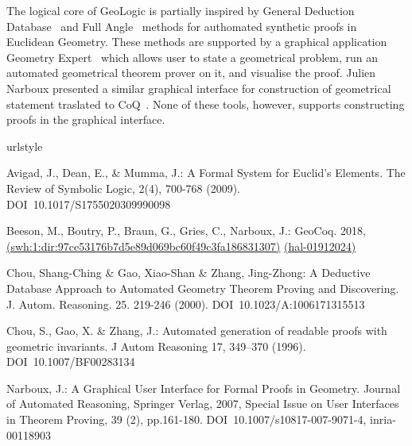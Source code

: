 \documentclass[runningheads]{llncs}
\begin{document}
The logical core of GeoLogic is partially inspired by General
Deduction Database~\cite{GDD} and Full Angle~\cite{FullAngle} methods for authomated synthetic proofs in
Euclidean Geometry.
These methods are supported by a graphical application
Geometry Expert~\cite{GEX} which allows user to state a
geometrical problem, run an automated geometrical theorem prover on
it, and visualise the proof.
Julien Narboux presented a similar graphical interface for
construction of geometrical statement traslated to
CoQ~\cite{GeoProof}.
None of these tools, however, supports constructing proofs in the
graphical interface.

\begin{thebibliography}
\expandafter\ifx\csname urlstyle\endcsname\relax
  \providecommand{\doi}[1]{DOI~\discretionary{}{}{}#1}\else
  \providecommand{\doi}{DOI~\discretionary{}{}{}\begingroup
  \urlstyle{rm}\Url}\fi

  Avigad, J., Dean, E., \& Mumma, J.: A Formal System for Euclid's Elements.
  \newblock The Review of Symbolic Logic, 2(4), 700-768 (2009).
  \newblock \doi{10.1017/S1755020309990098}

  Beeson, M., Boutry, P., Braun, G., Gries, C., Narboux, J.: GeoCoq. 2018,
  \newblock \href{https://archive.softwareheritage.org/browse/swh:1:dir:97ce53176b7d5e89d069bc60f49c3fa186831307}{(swh:1:dir:97ce53176b7d5e89d069bc60f49c3fa186831307)}
  \newblock \href{https://hal.inria.fr/hal-01912024}{(hal-01912024)}

  Chou, Shang-Ching \& Gao, Xiao-Shan \& Zhang, Jing-Zhong:
  A Deductive Database Approach to Automated Geometry Theorem Proving
  and Discovering.
  \newblock J. Autom. Reasoning. 25. 219-246 (2000).
  \newblock \doi{10.1023/A:1006171315513}

  Chou, S., Gao, X. \& Zhang, J.: Automated generation of readable proofs
  with geometric invariants.
  \newblock J Autom Reasoning 17, 349–370 (1996).
  \newblock \doi{10.1007/BF00283134}

  Narboux, J.: A Graphical User Interface for Formal Proofs in
  Geometry.
  \newblock Journal of Automated Reasoning, Springer Verlag, 2007,
  \newblock Special Issue on User Interfaces in Theorem Proving, 39
  (2), pp.161-180.
  \newblock \doi{10.1007/s10817-007-9071-4}, inria-00118903


\end{thebibliography}
\end{document}

